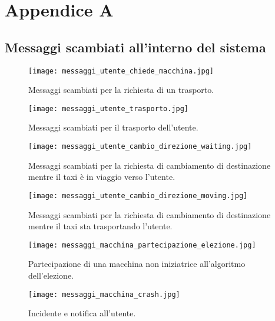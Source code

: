 
\chapter{Appendice A}
  

\section{Messaggi scambiati all'interno del sistema} \label{messaggi_scambiati_appendix}

\begin{figure}[htbp]
	\centering
	\texttt{[image: messaggi\_utente\_chiede\_macchina.jpg]}
	\caption{Messaggi scambiati per la richiesta di un trasporto.}
	\label{fig:messaggi_utente_chiede_macchina}
\end{figure}

\begin{figure}[htbp]
	\centering
	\texttt{[image: messaggi\_utente\_trasporto.jpg]}
	\caption{Messaggi scambiati per il trasporto dell'utente.}
	\label{fig:messaggi_utente_trasporto}
\end{figure}

\begin{figure}[htbp]
	\centering
	\texttt{[image: messaggi\_utente\_cambio\_direzione\_waiting.jpg]}
	\caption{Messaggi scambiati per la richiesta di cambiamento di destinazione mentre il taxi è in viaggio verso l'utente.}
	\label{fig:messaggi_utente_cambio_direzione_waiting}
\end{figure}

\begin{figure}[htbp]
	\centering
	\texttt{[image: messaggi\_utente\_cambio\_direzione\_moving.jpg]}
	\caption{Messaggi scambiati per la richiesta di cambiamento di destinazione mentre il taxi sta trasportando l'utente.}
	\label{fig:messaggi_utente_cambio_direzione_moving}
\end{figure}

\begin{figure}[htbp]
	\centering
	\texttt{[image: messaggi\_macchina\_partecipazione\_elezione.jpg]}
	\caption{Partecipazione di una macchina non iniziatrice all'algoritmo dell'elezione.}
	\label{fig:messaggi_macchina_partecipazione_elezione}
\end{figure}

\begin{figure}[htbp]
	\centering
	\texttt{[image: messaggi\_macchina\_crash.jpg]}
	\caption{Incidente e notifica all'utente.}
	\label{fig:messaggi_macchina_crash}
\end{figure}


